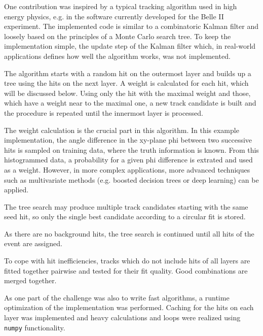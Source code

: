 One contribution was inspired by a typical tracking algorithm used in high energy physics, e.g. in the software currently developed for the Belle II experiment. 
The implemented code is similar to a combinatoric Kalman filter and loosely based on the principles of a Monte Carlo search tree. 
To keep the implementation simple, the update step of the Kalman filter which, in real-world applications defines how well the algorithm works, was not implemented.

The algorithm starts with a random hit on the outermost layer and builds up a tree using the hits on the next layer. 
A weight is calculated for each hit, which will be discussed below. 
Using only the hit with the maximal weight and those, which have a weight near to the maximal one, a new track candidate is built and the procedure is repeated until the innermost layer is processed. 

The weight calculation is the crucial part in this algorithm. 
In this example implementation, the angle difference in the xy-plane phi between two successive hits is sampled on training data, where the truth information is known. 
From this histogrammed data, a probability for a given phi difference is extrated and used as a weight. However, in more complex applications, more advanced techniques such as multivariate methods (e.g. boosted decision trees or deep learning) can be applied.

The tree search may produce multiple track candidates starting with the same seed hit, so only the single best candidate according to a circular fit is stored.

As there are no background hits, the tree search is continued until all hits of the event are assigned.

To cope with hit inefficiencies, tracks which do not include hits of all layers are fitted together pairwise and tested for their fit quality. Good combinations are merged together.

As one part of the challenge was also to write fast algorithms, a runtime optimization of the implementation was performed. 
Caching for the hits on each layer was implemented and heavy calculations and loops were realized using \texttt{numpy} functionality.
